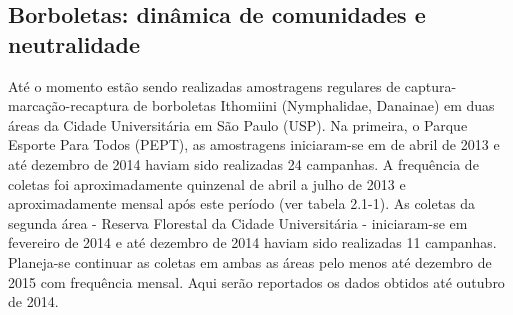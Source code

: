 \subsection{Borboletas: dinâmica de comunidades e neutralidade} %
\label{sec:dinamica-temporal-borb} 
Até o momento estão sendo realizadas amostragens regulares de captura-marcação-recaptura de borboletas Ithomiini (Nymphalidae, Danainae) em duas áreas da Cidade Universitária em São Paulo (USP). Na primeira, o Parque Esporte Para Todos (PEPT), as amostragens iniciaram-se em de abril de 2013 e até dezembro de 2014 haviam sido realizadas 24 campanhas. A frequência de coletas foi aproximadamente quinzenal de abril a julho de 2013 e aproximadamente mensal após este período (ver tabela 2.1-1). As coletas da segunda área - Reserva Florestal da Cidade Universitária - iniciaram-se em fevereiro de 2014 e até dezembro de 2014 haviam sido realizadas 11 campanhas. Planeja-se continuar as coletas em ambas as áreas pelo menos até dezembro de 2015 com frequência mensal. Aqui serão reportados os dados obtidos até outubro de 2014.

